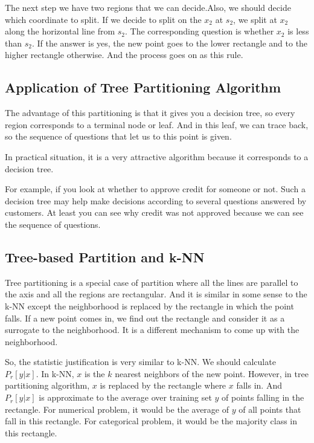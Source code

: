 \documentclass{article}
\begin{document}
{	 The next step we have two regions that we can decide.Also, we should decide which coordinate to split. If we decide to split on the $x_2$ at $s_2$, we split at $x_2$ along the horizontal line from $s_2$. The corresponding question is whether $x_2$ is less than $s_2$. If the answer is yes, the new point goes to the lower rectangle and to the higher rectangle otherwise. And the process goes on as this rule. 
	 
\subsection{Application of Tree Partitioning Algorithm}{
	The advantage of this partitioning is that it gives you a decision tree, so every region corresponds to a terminal node or leaf. And in this leaf, we can trace back, so the sequence of questions that let us to this point is given. 
	
	In practical situation, it is a very attractive algorithm because it corresponds to a decision tree. 
	 
	For example, if you look at whether to approve credit for someone or not. Such a decision tree may help make decisions  according to several questions answered by customers. At least you can see why credit was not approved because we can see the sequence of questions.}

\subsection{Tree-based Partition and k-NN}{
	Tree partitioning is a special case of partition where all the lines are parallel to the axis and all the regions are rectangular. And it is similar in some sense to the k-NN except the neighborhood is replaced by the rectangle in which the point falls. If a new point comes in, we find out the rectangle and consider it as a surrogate to the neighborhood. It is a different mechanism to come up with the neighborhood.
	
	So, the statistic justification is very similar to k-NN. We should calculate  \(P_r[y|x]\). In k-NN, $x$ is the $k$ nearest neighbors of the new point. However, in tree partitioning algorithm, $x$ is replaced by the rectangle where $x$ falls in. And \(P_r[y|x]\) is approximate to the average over training set $y$ of points falling in the rectangle. For numerical problem, it would be the average of $y$ of all points that fall in this rectangle. For categorical problem, it would be the majority class in this rectangle.
}
	
}
\end{document}
